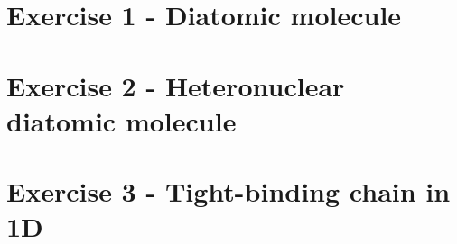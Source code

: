 








\section{Exercise 1 - Diatomic molecule}


\section{Exercise 2 - Heteronuclear diatomic molecule}


\section{Exercise 3 - Tight-binding chain in 1D}




